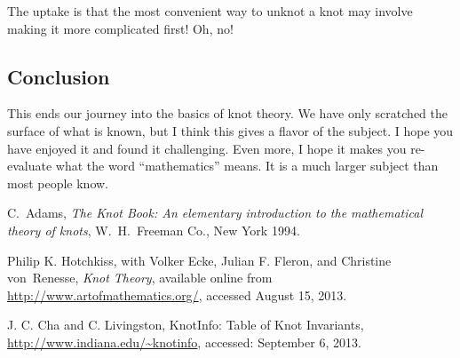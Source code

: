 \documentclass[12pt,letterpaper]{article}
\theoremstyle{definition}
\begin{document}
The uptake is that the most convenient way to unknot a knot may involve making it more complicated first!
Oh, no!

\subsection*{Conclusion}
This ends our journey into the basics of knot theory.
We have only scratched the surface of what is known, but I think this gives a flavor of the subject. 
I hope you have enjoyed it and found it challenging.
Even more, I hope it makes you re-evaluate what the word ``mathematics'' means.
It is a much larger subject than most people know.

\begin{thebibliography}{9}


    C.~Adams,
    \emph{The Knot Book: An elementary introduction to the mathematical theory of knots},
    W.~H.~Freeman Co., New York 1994.

	Philip K. Hotchkiss, with Volker Ecke, Julian F. Fleron, and Christine von~Renesse,
	\emph{Knot Theory},
	available online from \url{http://www.artofmathematics.org/},
	accessed August 15, 2013.

	J. C. Cha and C. Livingston,
	KnotInfo: Table of Knot Invariants,
	\url{http://www.indiana.edu/~knotinfo},
	accessed: September 6, 2013.


\end{thebibliography}
\end{document}
